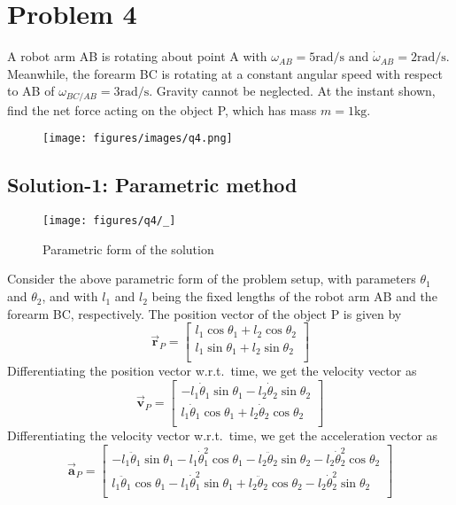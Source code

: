 \section*{Problem 4}

A robot arm AB is rotating about point A with \( \omega_{AB} = 5 \text{rad/s} \) and \( \dot\omega_{AB} = 2 \text{rad/s} \).
Meanwhile, the forearm BC is rotating at a constant angular speed with respect to AB of \( \omega_{BC/AB} = 3 \text{rad/s} \).
Gravity cannot be neglected.
At the instant shown, find the net force acting on the object P, which has mass \( m = 1\text{kg} \).

\begin{figure*}[h]
    \centering
    \texttt{[image: figures/images/q4.png]}
\end{figure*}

\subsection*{Solution-1: Parametric method}

\begin{figure*}[htb]
    \centering
    \texttt{[image: figures/q4/\_]}
    \caption{
        Parametric form of the solution
    }
\end{figure*}

Consider the above parametric form of the problem setup, with parameters \(\theta_1\) and \(\theta_2\), and with \(l_1\) and \(l_2\) being the fixed lengths of the robot arm AB and the forearm BC, respectively.
The position vector of the object P is given by
\[
    \vec{\mathbf{r}}_P =
    \begin{bmatrix}
        l_1 \cos\theta_1 + l_2 \cos\theta_2 \\
        l_1 \sin\theta_1 + l_2 \sin\theta_2 \\
    \end{bmatrix}
\]
Differentiating the position vector w.r.t.\ time, we get the velocity vector as
\[
    \vec{\mathbf{v}}_P =
    \begin{bmatrix}
        -l_1 \dot\theta_1 \sin\theta_1 - l_2 \dot\theta_2 \sin\theta_2 \\
        l_1 \dot\theta_1 \cos\theta_1 + l_2 \dot\theta_2 \cos\theta_2  \\
    \end{bmatrix}
\]
Differentiating the velocity vector w.r.t.\ time, we get the acceleration vector as
\[
    \vec{\mathbf{a}}_P =
    \begin{bmatrix}
        -l_1 \ddot\theta_1 \sin\theta_1 - l_1 \dot\theta_1^2 \cos\theta_1 - l_2 \ddot\theta_2 \sin\theta_2 - l_2 \dot\theta_2^2 \cos\theta_2 \\
        l_1 \ddot\theta_1 \cos\theta_1 - l_1 \dot\theta_1^2 \sin\theta_1 + l_2 \ddot\theta_2 \cos\theta_2 - l_2 \dot\theta_2^2 \sin\theta_2  \\
    \end{bmatrix}
\]


